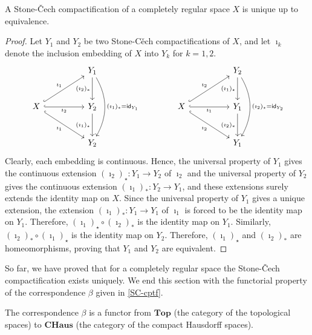 \begin{prop}
    A Stone-\v{C}ech compactification of a completely regular space $X$ is unique up to equivalence.
\end{prop}
\begin{proof}
    Let $Y_1$ and $Y_2$ be two Stone-C\v{e}ch compactifications of $X$, and let $\imath_k$ denote the inclusion embedding of $X$ into $Y_k$ for $k=1, 2$.
    \begin{equation*}
        \begin{tikzcd}[row sep=large, column sep=huge]
            & Y_1\arrow[d, "(\imath_2)_*"']\arrow[dd, bend left, "(\imath_1)_*=\textsf{id}_{Y_1}"]\\
            X
            \arrow[ur, "\imath_1", hook]
            \arrow[r, "\imath_2"', hook]
            \arrow[dr, "\imath_1"', hook]
            & Y_2\arrow[d, "(\imath_1)_\star"']\\
            & Y_2
        \end{tikzcd}
        \qquad\qquad
        \begin{tikzcd}[row sep=large, column sep=huge]
            & Y_2\arrow[d, "(\imath_1)_\star"']\arrow[dd, bend left, "(\imath_2)_\star=\textsf{id}_{Y_2}"]\\
            X
            \arrow[ur, "\imath_2", hook]
            \arrow[r, "\imath_1"', hook]
            \arrow[dr, "\imath_2"', hook]
            & Y_1\arrow[d, "(\imath_2)_*"']\\
            & Y_1
        \end{tikzcd}
        \end{equation*}
    Clearly, each embedding is continuous.
    Hence, the universal property of $Y_1$ gives the continuous extension $(\imath_2)_\star: Y_1\rightarrow Y_2$ of $\imath_2$ and the universal property of $Y_2$ gives the continuous extension $(\imath_1)_*: Y_2\rightarrow Y_1$, and these extensions surely extends the identity map on $X$.
    Since the universal property of $Y_1$ gives a unique extension, the extension $(\imath_1)_*: Y_1\rightarrow Y_1$ of $\imath_1$ is forced to be the identity map on $Y_1$.
    Therefore, $(\imath_1)_\star\circ(\imath_2)_*$ is the identity map on $Y_1$.
    Similarly, $(\imath_2)_*\circ(\imath_1)_\star$ is the identity map on $Y_2$.
    Therefore, $(\imath_1)_\star$ and $(\imath_2)_*$ are homeomorphisms, proving that $Y_1$ and $Y_2$ are equivalent.
\end{proof}

So far, we have proved that for a completely regular space the Stone-\v{C}ech compactification exists uniquely.
We end this section with the functorial property of the correspondence $\beta$ given in \cref{SC-cptf}.
\begin{prop}
    The correspondence $\beta$ is a functor from $\textbf{Top}$ (the category of the topological spaces) to $\textbf{CHaus}$ (the category of the compact Hausdorff spaces).
\end{prop}